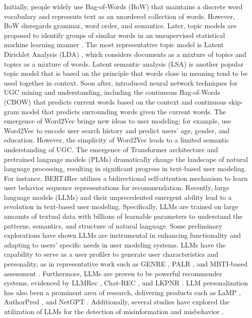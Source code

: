 \documentclass[11pt]{article}
\begin{document}
Initially, people widely use Bag-of-Words (BoW) \cite{harris1954distributional} that maintains a discrete word vocabulary and represents text as an unordered collection of words. However, BoW disregards grammar, word order, and semantics. Later, topic models are proposed to identify groups of similar words in an unsupervised statistical machine learning manner \cite{alghamdi2015survey}. The most representative topic model is Latent Dirichlet Analysis (LDA) \cite{blei2003latent}, which considers documents as a mixture of topics and topics as a mixture of words. Latent semantic analysis (LSA) \cite{dumais2004latent} is another popular topic model that is based on the principle that words close in meaning tend to be used together in context.
Soon after, \citet{mikolov2013efficient} introduced neural network techniques for UGC mining and understanding, including the continuous Bag-of-Words (CBOW) that predicts current words based on the context and continuous skip-gram model that predicts surrounding words given the current words. The emergence of Word2Vec brings new ideas to user modeling; for example, \citet{hu2017user} use Word2Vec to encode user search history and predict users' age, gender, and education. However, the simplicity of Word2Vec leads to a limited semantic understanding of UGC. The emergence of Transformer architecture \cite{vaswani2017attention} and pretrained language models (PLMs) \cite{kenton2019bert,qiu2020pre} dramatically change the landscape of natural language processing, resulting in significant progress in text-based user modeling. For instance, BERT4Rec \cite{sun2019bert4rec} utilizes a bidirectional self-attention mechanism to learn user behavior sequence representations for recommendation. Recently, large language models (LLMs) and their unprecedented emergent ability lead to a revolution in text-based user modeling. Specifically, LLMs are trained on large amounts of textual data with billions of learnable parameters to understand the patterns, semantics, and structure of natural language. Some preliminary explorations have shown LLMs are instrumental in enhancing functionality and adapting to users' specific needs in user modeling systems. LLMs have the capability to serve as a user profiler to generate user characteristics and personality, as in representative work such as GENRE \cite{liu2023genre}, PALR \cite{chen2023palr}, and MBTI-based assessment \citet{rao2023can}. Furthermore, LLMs are proven to be powerful recommender systems, evidenced by LLMRec \cite{liu2023llmrec}, Chat-REC \cite{gao2023chat}, and LKPNR \cite{runfeng2023lkpnr}. LLM personalization has also been a prominent area of research, delivering products such as LaMP \cite{salemi2023lamp}, AuthorPred \cite{li2023teach}, and NetGPT \cite{chen2023netgpt}. Additionally, several studies have explored the utilization of LLMs for the detection of misinformation and misbehavior \cite{mozes2023use, labonne2023spam}. 
\end{document}
